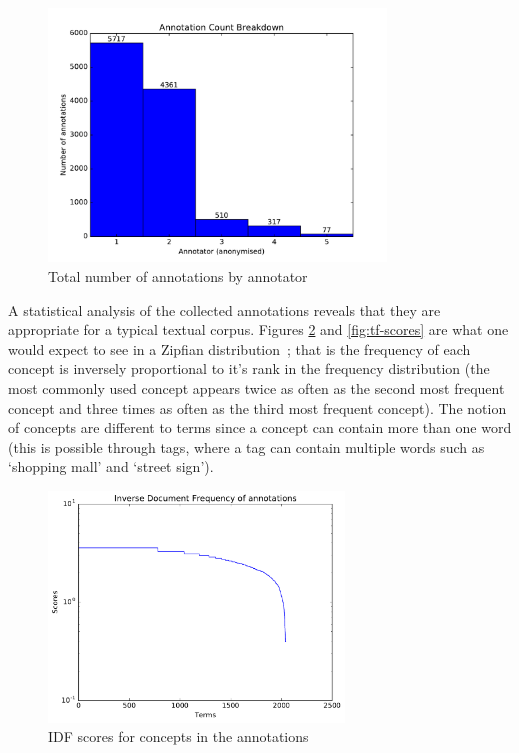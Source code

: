 \begin{figure}[t]
    \centering
    \includegraphics[width=0.8\textwidth]{graphs/annotator-breakdown}
    \caption{Total number of annotations by annotator}
    \label{fig:annotator-breakdown}
\end{figure}

A statistical analysis of the collected annotations reveals that they are appropriate for a typical textual corpus. Figures \ref{fig:idf-scores} and \ref{fig:tf-scores} are what one would expect to see in a Zipfian distribution~\cite{tullo2003modelling}; that is the frequency of each concept is inversely proportional to it's rank in the frequency distribution (the most commonly used concept appears twice as often as the second most frequent concept and three times as often as the third most frequent concept). The notion of concepts are different to terms since a concept can contain more than one word (this is possible through tags, where a tag can contain multiple words such as `shopping mall' and `street sign').

\begin{figure}[b]
    \centering
    \includegraphics[width=0.7\textwidth]{graphs/idf-scores}
    \caption{IDF scores for concepts in the annotations}
    \label{fig:idf-scores}
\end{figure}

